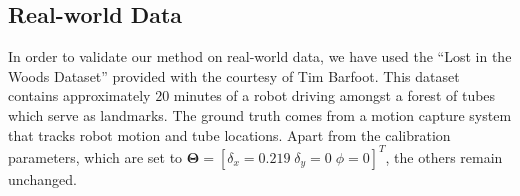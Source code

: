 \subsection{Real-world Data}

In order to validate our method on real-world data, we have used the ``Lost in
the Woods Dataset'' provided with the courtesy of Tim Barfoot. This dataset
contains approximately $20$ minutes of a robot driving amongst a forest of
tubes which serve as landmarks. The ground truth comes from a motion capture
system that tracks robot motion and tube locations. Apart from the calibration
parameters, which are set to $\mathbf{\Theta}=[\delta_x=0.219\;\delta_y=0\;
\phi=0]^T$, the others remain unchanged.
